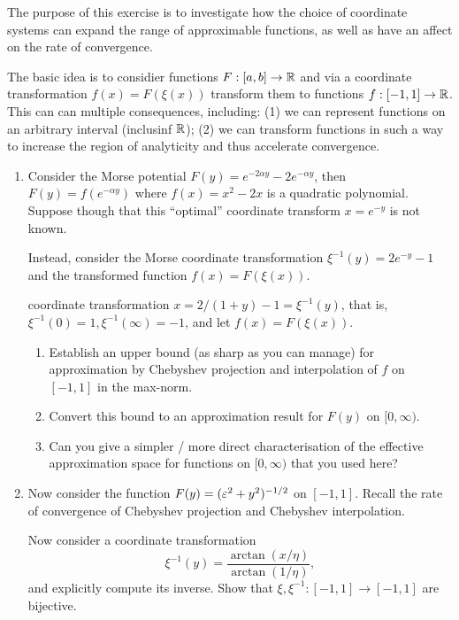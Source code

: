 \begin{exercise}
   \label{exr:poly:coordinates}
   The purpose of this exercise is to investigate how the choice of 
   coordinate systems can expand the range of approximable functions, as 
   well as have an affect on the rate of convergence.

   The basic idea is to considier functions $F : [a, b] \to \mathbb{R}$ and via a
   coordinate transformation $f(x) = F(\xi(x))$ transform them to functions $f :
   [-1,1] \to \mathbb{R}$. This can can multiple consequences, including: (1) we can
   represent functions on an arbitrary interval (inclusinf $\mathbb{R}$); (2) we can
   transform functions in such a way to increase the region of analyticity and
   thus accelerate convergence.
   \begin{enumerate} \ilist
      \item Consider the Morse potential $F(y) = e^{-2\alpha y} - 2 e^{-\alpha
      y}$, then $F(y) = f(e^{-\alpha y})$ where $f(x) = x^2 - 2x$ is a quadratic
      polynomial. Suppose though that this ``optimal'' coordinate transform $x =
      e^{-y}$ is not known. 

      Instead, consider the Morse coordinate transformation $\xi^{-1}(y) = 2
      e^{-y} - 1$ and the transformed function $f(x) = F(\xi(x))$.
      
      coordinate transformation $x = 2/(1+y) - 1 =
      \xi^{-1}(y)$, that is, $\xi^{-1}(0) = 1, \xi^{-1}(\infty) = -1$, and 
      let $f(x) = F(\xi(x))$. 
      \begin{enumerate} \alist 
         \item Establish an upper bound (as sharp as you can manage) for
          approximation by Chebyshev projection and interpolation of $f$ on
          $[-1,1]$ in the max-norm. 
         \item Convert this bound to an approximation result for $F(y)$ on $[0,
          \infty)$. 
         \item Can you give a simpler / more direct characterisation of the
         effective approximation space for functions on $[0, \infty)$ that you
         used here?
      \end{enumerate}
      
      \item Now consider the function $F(y) = (\varepsilon^2 + y^2)^{-1/2}$ on 
      $[-1, 1]$. Recall the rate of convergence of Chebyshev projection and 
      Chebyshev interpolation. 

      Now consider a coordinate transformation 
      \[
         \xi^{-1}(y) = \frac{\arctan(x/\eta)}{\arctan(1/\eta)},
      \]
      and explicitly compute its inverse. Show that $\xi, \xi^{-1} : [-1,1] \to
      [-1,1]$ are bijective. 


\end{enumerate}
\end{exercise}
